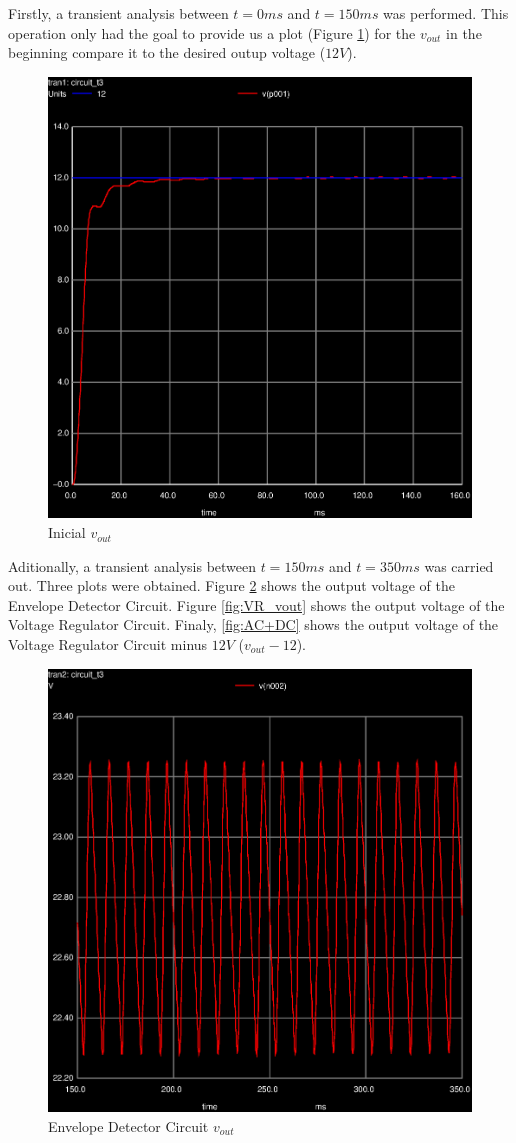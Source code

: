 Firstly, a transient analysis between $t=0ms$ and $t=150ms$ was performed. This operation
only had the goal to provide us a plot (Figure \ref{fig:graph_global}) for the
$v_{out}$ in the beginning compare it to the desired outup voltage ($12V$).

\begin{figure}[ht]
	\centering
	\includegraphics[width=0.5\linewidth]{trans-vout_vr_all.eps}
	\caption{Inicial $v_{out}$}
\label{fig:graph_global}
\end{figure}


Aditionally, a transient analysis between $t=150ms$ and $t=350ms$ was carried out. Three plots
were obtained. Figure \ref{fig:EV_vout} shows the output voltage of the Envelope Detector
Circuit. Figure \ref{fig:VR_vout} shows the output voltage of the Voltage Regulator Circuit.
Finaly, \ref{fig:AC+DC} shows the output voltage of the Voltage Regulator Circuit minus $12V$
($v_{out}-12$).


\begin{figure}[ht]
	\centering
	\includegraphics[width=0.6\linewidth]{trans-vout_ed.eps}
	\caption{Envelope Detector Circuit $v_{out}$}
\label{fig:EV_vout}
\end{figure}

